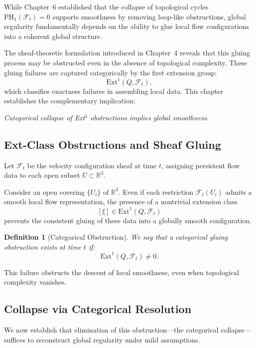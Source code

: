 \documentclass[11pt]{article}
\newtheorem{definition}[theorem]{Definition}
\begin{document}
While Chapter~6 established that the collapse of topological cycles \( \mathrm{PH}_1(\mathcal{F}_t) = 0 \) supports smoothness by removing loop-like obstructions, global regularity fundamentally depends on the ability to glue local flow configurations into a coherent global structure.

The sheaf-theoretic formulation introduced in Chapter~4 reveals that this gluing process may be obstructed even in the absence of topological complexity. These gluing failures are captured categorically by the first extension group:
\[
\mathrm{Ext}^1(Q, \mathcal{F}_t),
\]
which classifies exactness failures in assembling local data. This chapter establishes the complementary implication:
\begin{center}
\textit{Categorical collapse of Ext$^1$ obstructions implies global smoothness.}
\end{center}

\subsection{Ext-Class Obstructions and Sheaf Gluing}

Let \( \mathcal{F}_t \) be the velocity configuration sheaf at time \( t \), assigning persistent flow data to each open subset \( U \subset \mathbb{R}^3 \).  

Consider an open covering \( \{U_i\} \) of \( \mathbb{R}^3 \). Even if each restriction \( \mathcal{F}_t(U_i) \) admits a smooth local flow representation, the presence of a nontrivial extension class
\[
[\xi] \in \mathrm{Ext}^1(Q, \mathcal{F}_t)
\]
prevents the consistent gluing of these data into a globally smooth configuration.

\begin{definition}[Categorical Obstruction]
We say that a categorical gluing obstruction exists at time \( t \) if:
\[
\mathrm{Ext}^1(Q, \mathcal{F}_t) \neq 0.
\]
\end{definition}

This failure obstructs the descent of local smoothness, even when topological complexity vanishes.

\subsection{Collapse via Categorical Resolution}

We now establish that elimination of this obstruction—the categorical collapse—suffices to reconstruct global regularity under mild assumptions.
\end{document}
